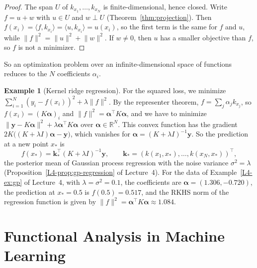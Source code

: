 \documentclass[11pt]{article}
\newcommand{\norm}[1]{\lVert #1 \rVert}
\newcommand{\ip}[2]{\langle #1, #2 \rangle}
\theoremstyle{definition}
\newtheorem{example}[definition]{Example}
\theoremstyle{plain}
\theoremstyle{remark}
\begin{document}
\begin{proof}
    The span $U$ of $k_{x_1}, \ldots, k_{x_N}$ is finite-dimensional, hence closed. Write $f = u + w$ with $u \in U$ and $w \perp U$ (Theorem~\ref{thm:projection}). Then $f(x_i) = \ip{f}{k_{x_i}} = \ip{u}{k_{x_i}} = u(x_i)$, so the first term is the same for $f$ and $u$, while $\norm{f}^2 = \norm{u}^2 + \norm{w}^2$. If $w \neq 0$, then $u$ has a smaller objective than $f$, so $f$ is not a minimizer.
\end{proof}

So an optimization problem over an infinite-dimensional space of functions reduces to the $N$ coefficients $\alpha_i$.

\begin{example}[Kernel ridge regression]\label{ex:kernel-ridge}
    For the squared loss, we minimize $\sum_{i=1}^N (y_i - f(x_i))^2 + \lambda\norm{f}^2$. By the representer theorem, $f = \sum_j \alpha_jk_{x_j}$, so $f(x_i) = (K\boldsymbol{\alpha})_i$ and $\norm{f}^2 = \boldsymbol{\alpha}^\top K\boldsymbol{\alpha}$, and we have to minimize $\norm{\mathbf{y} - K\boldsymbol{\alpha}}^2 + \lambda\boldsymbol{\alpha}^\top K\boldsymbol{\alpha}$ over $\boldsymbol{\alpha} \in \mathbb{R}^N$. This convex function has the gradient $2K\big((K + \lambda I)\boldsymbol{\alpha} - \mathbf{y}\big)$, which vanishes for $\boldsymbol{\alpha} = (K + \lambda I)^{-1}\mathbf{y}$. So the prediction at a new point $x_*$ is
    \[f(x_*) = \mathbf{k}_*^\top(K + \lambda I)^{-1}\mathbf{y}, \qquad \mathbf{k}_* = (k(x_1, x_*), \ldots, k(x_N, x_*))^\top,\]
    the posterior mean of Gaussian process regression with the noise variance $\sigma^2 = \lambda$ (Proposition~\ref{L4-prop:gp-regression} of Lecture~4). For the data of Example~\ref{L4-ex:gp} of Lecture~4, with $\lambda = \sigma^2 = 0.1$, the coefficients are $\boldsymbol{\alpha} = (1.306, -0.720)$, the prediction at $x_* = 0.5$ is $f(0.5) = 0.517$, and the RKHS norm of the regression function is given by $\norm{f}^2 = \boldsymbol{\alpha}^\top K\boldsymbol{\alpha} \approx 1.084$.
\end{example}

\section{Functional Analysis in Machine Learning}\label{sec:fa-ml}
\end{document}
